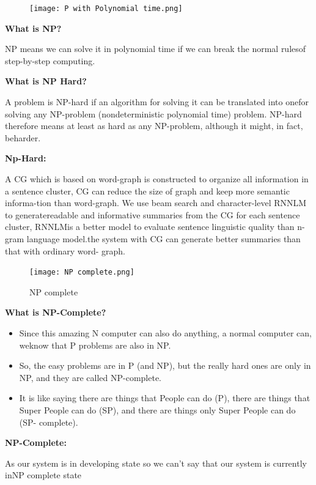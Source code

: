 \documentclass[12pt]{report}
\begin{document}
\begin{figure}[h]
\centering
\texttt{[image: P with Polynomial time.png]}


\end{figure}

\vspace{1cm}

\textbf{What is NP?
}

NP means we can solve it in polynomial time if we can break the normal rulesof step-by-step
computing.

\textbf{What is NP Hard?}

A problem is NP-hard if an algorithm for solving it can be translated into onefor solving
any NP-problem (nondeterministic polynomial time) problem. NP-hard therefore means at
least as hard as any NP-problem, although it might, in fact, beharder.

\textbf{Np-Hard:
}

A CG which is based on word-graph is constructed to organize all information in a sentence 
cluster, CG can reduce the size of graph and keep more semantic informa-tion than word-graph. 
We use beam search and character-level RNNLM to generatereadable and informative summaries
from the CG for each sentence cluster, RNNLMis a better model to evaluate sentence linguistic
quality than n-gram language model.the system with CG can generate better summaries than that 
with ordinary word- graph.

\begin{figure}[h]
\centering
\texttt{[image: NP complete.png]}
\caption{NP complete}
\label{NP complete
}
\end{figure}

\vspace{1cm}

\textbf{What is NP-Complete?
}
\begin{itemize}
\item Since this amazing N computer can also do anything, a normal computer can, weknow 
that P problems are also in NP.
\item So, the easy problems are in P (and NP), but the really hard ones are only in
NP, and they are called NP-complete.
\item It is like saying there are things that People can do (P), there are things that Super 
People can do (SP), and there are things only Super People can do (SP- complete).
\end{itemize}
\textbf{NP-Complete:}

As our system is in developing state so we can’t say that our system is currently inNP
complete state
\end{document}
